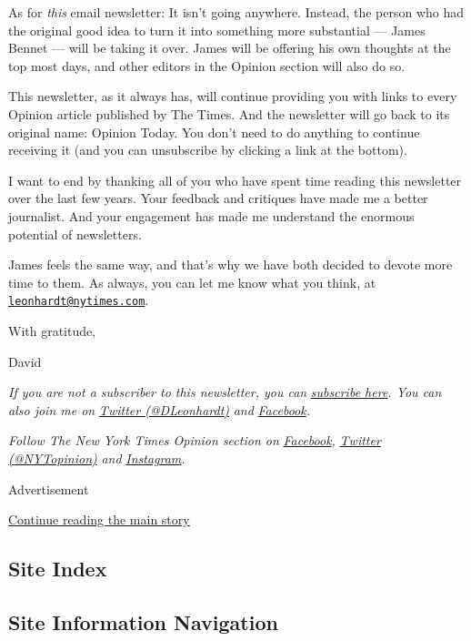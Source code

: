 As for \emph{this} email newsletter: It isn't going anywhere. Instead,
the person who had the original good idea to turn it into something more
substantial --- James Bennet --- will be taking it over. James will be
offering his own thoughts at the top most days, and other editors in the
Opinion section will also do so.

This newsletter, as it always has, will continue providing you with
links to every Opinion article published by The Times. And the
newsletter will go back to its original name: Opinion Today. You don't
need to do anything to continue receiving it (and you can unsubscribe by
clicking a link at the bottom).

I want to end by thanking all of you who have spent time reading this
newsletter over the last few years. Your feedback and critiques have
made me a better journalist. And your engagement has made me understand
the enormous potential of newsletters.

James feels the same way, and that's why we have both decided to devote
more time to them. As always, you can let me know what you think, at
\href{mailto:leonhardt@nytimes.com}{\nolinkurl{leonhardt@nytimes.com}}.

With gratitude,

David

\emph{If you are not a subscriber to this newsletter, you can}
\href{https://www.nytimes.com/newsletters/david-leonhardt}{\emph{subscribe
here}}\emph{. You can also join me on}
\href{https://twitter.com/DLeonhardt}{\emph{Twitter (@DLeonhardt)}}
\emph{and}
\href{https://www.facebook.com/DavidRLeonhardt/}{\emph{Facebook}}\emph{.}

\emph{Follow The New York Times Opinion section on}
\href{https://www.facebook.com/nytopinion}{\emph{Facebook}}\emph{,}
\href{http://twitter.com/NYTOpinion}{\emph{Twitter (@NYTopinion)}}
\emph{and}
\href{https://www.instagram.com/nytopinion/}{\emph{Instagram}}\emph{.}

Advertisement

\protect\hyperlink{after-bottom}{Continue reading the main story}

\hypertarget{site-index}{%
\subsection{Site Index}\label{site-index}}

\hypertarget{site-information-navigation}{%
\subsection{Site Information
Navigation}\label{site-information-navigation}}

